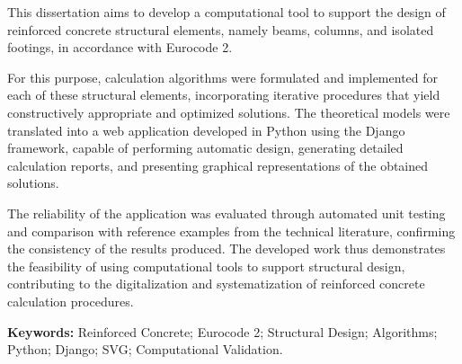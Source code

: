This dissertation aims to develop a computational tool to support the design of reinforced concrete structural elements, namely beams, columns, and isolated footings, in accordance with Eurocode 2.

For this purpose, calculation algorithms were formulated and implemented for each of these structural elements, incorporating iterative procedures that yield constructively appropriate and optimized solutions. The theoretical models were translated into a web application developed in Python using the Django framework, capable of performing automatic design, generating detailed calculation reports, and presenting graphical representations of the obtained solutions.

The reliability of the application was evaluated through automated unit testing and comparison with reference examples from the technical literature, confirming the consistency of the results produced. The developed work thus demonstrates the feasibility of using computational tools to support structural design, contributing to the digitalization and systematization of reinforced concrete calculation procedures.



\vfill
\textbf{Keywords:} Reinforced Concrete; Eurocode 2; Structural Design; Algorithms; Python; Django; SVG; Computational Validation.